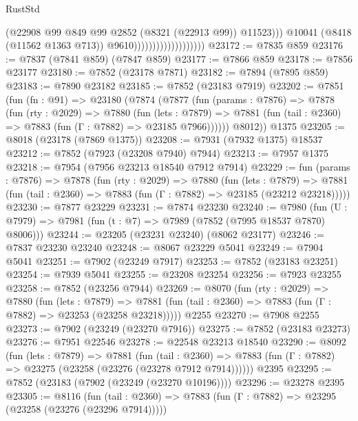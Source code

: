 \begin{lexlean}{RustStd}
\begin{coremodule}
                                              (@22908
                                                @99
                                                @849
                                                @99
                                                @2852
                                                (@8321 (@22913 @99))
                                                @11523)))
                                          @10041
                                          (@8418 (@11562 @1363 @713))
                                          @9610)))))))))))))))))))
@23172 := @7835 @859
@23176 := @7837 (@7841 @859) (@7847 @859)
@23177 := @7866 @859
@23178 := @7856 @23177
@23180 := @7852 (@23178 @7871)
@23182 := @7894 (@7895 @859)
@23183 := @7890 @23182
@23185 := @7852 (@23183 @7919)
@23202 := @7851
    (fun (fn : @91) =>
    @23180
      (@7874
        (@7877
          (fun (params : @7876) =>
          @7878
            (fun (rty : @2029) =>
            @7880
              (fun (lets : @7879) =>
              @7881 (fun (tail : @2360) => @7883 (fun (Γ : @7882) => @23185 @7966))))))
        @8012))
    @1375
@23205 := @8018 (@23178 (@7869 @1375))
@23208 := @7931 (@7932 @1375) @18537
@23212 := @7852 (@7923 (@23208 @7940) @7944)
@23213 := @7957 @1375
@23218 := @7954 (@7956 @23213 @18540 @7912 @7914)
@23229 := fun (params : @7876) =>
  @7878
    (fun (rty : @2029) =>
    @7880
      (fun (lets : @7879) =>
      @7881 (fun (tail : @2360) => @7883 (fun (Γ : @7882) => @23185 (@23212 @23218)))))
@23230 := @7877 @23229
@23231 := @7874 @23230
@23240 := @7980
    (fun (U : @7979) => @7981 (fun (t : @7) => @7989 (@7852 (@7995 @18537 @7870) @8006)))
@23244 := @23205 (@23231 @23240) (@8062 @23177)
@23246 := @7837 @23230 @23240
@23248 := @8067 @23229 @5041
@23249 := @7904 @5041
@23251 := @7902 (@23249 @7917)
@23253 := @7852 (@23183 @23251)
@23254 := @7939 @5041
@23255 := @23208 @23254
@23256 := @7923 @23255
@23258 := @7852 (@23256 @7944)
@23269 := @8070
    (fun (rty : @2029) =>
    @7880
      (fun (lets : @7879) =>
      @7881 (fun (tail : @2360) => @7883 (fun (Γ : @7882) => @23253 (@23258 @23218)))))
    @2255
@23270 := @7908 @2255
@23273 := @7902 (@23249 (@23270 @7916))
@23275 := @7852 (@23183 @23273)
@23276 := @7951 @22546
@23278 := @22548 @23213 @18540
@23290 := @8092
    (fun (lets : @7879) =>
    @7881
      (fun (tail : @2360) =>
      @7883 (fun (Γ : @7882) => @23275 (@23258 (@23276 (@23278 @7912 @7914))))))
    @2395
@23295 := @7852 (@23183 (@7902 (@23249 (@23270 @10196))))
@23296 := @23278 @2395
@23305 := @8116
    (fun (tail : @2360) => @7883 (fun (Γ : @7882) => @23295 (@23258 (@23276 (@23296 @7914)))))

\end{coremodule}
\end{lexlean}
